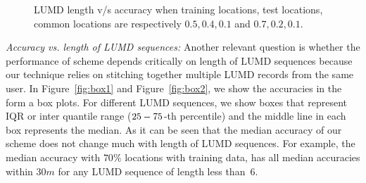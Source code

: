 \documentclass[conference, 10pt]{IEEEtran}
\begin{document}
\begin{figure}[t]
\begin{center}
\caption{LUMD length v/s accuracy
when training locations, test
locations, common locations are respectively $0.5,0.4,0.1$ and $0.7,0.2,0.1$.}
\end{center}
\end{figure}


{\em Accuracy vs. length of LUMD sequences:} Another relevant question is whether the
performance of scheme depends critically on length of LUMD sequences because our
technique relies on stitching together multiple LUMD records from the same user. In
Figure~\ref{fig:box1} and Figure~\ref{fig:box2}, we show the accuracies in the form a
box plots. For different LUMD sequences, we show boxes that represent IQR or inter 
quantile range ($25\--75$-th percentile) and the middle line in each box represents the median.
As it can be seen that the median accuracy of our scheme does not change much with
length of LUMD sequences. For example, the median accuracy with $70\%$ locations with
training data, has all median accuracies within $30m$ for any LUMD sequence of length
less than~6.
\end{document}
